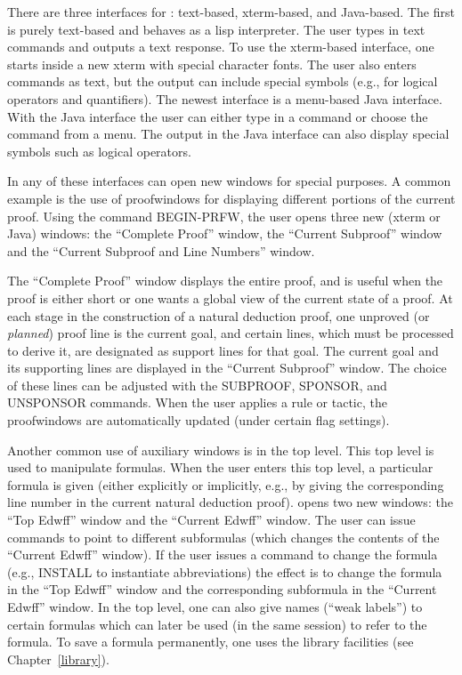 \documentclass[10pt,twoside]{book}
\begin{document}
There are three interfaces for {\TPS}: text-based,
xterm-based, and Java-based.  The first
is purely text-based and behaves as a lisp interpreter.
The user types in text commands and {\TPS} outputs
a text response. %
To use the xterm-based interface, one starts
{\TPS} inside a new xterm with special character fonts.
The user also enters commands as text, but the output
can include special symbols (e.g., for logical operators
and quantifiers). %
The newest interface is a
menu-based Java interface.
With the Java interface
the user can either type in a command or choose
the command from a menu.  The output in the Java interface
can also display special symbols such as logical operators. 

In any of these interfaces {\TPS} can open new windows
for special purposes.  A common example is the use
of proofwindows for displaying different portions of the current
proof.  Using the command {\indexcommand BEGIN-PRFW}, the user opens
three new (xterm or Java) windows: the ``Complete Proof'' window,
the ``Current Subproof'' window and the ``Current Subproof and Line Numbers''
window.

The ``Complete Proof'' window displays the entire proof, and is useful
when the proof is either short or one wants a global view of the
current state of a proof.  At each stage in the construction of a
natural deduction proof, one unproved (or {\it planned}) proof line is
the current goal, and certain lines, which must be processed to derive
it, are designated as support lines for that goal. The current goal
and its supporting lines are displayed in the ``Current Subproof''
window.  The choice of these lines can be adjusted with the 
SUBPROOF, SPONSOR, and UNSPONSOR commands.
When the user applies a rule or tactic, the proofwindows
are automatically updated (under certain flag settings).

Another common use of auxiliary windows is in the
 top level.
This top level is used to manipulate formulas.
When the user enters this top level, a particular
formula is given (either explicitly or implicitly,
e.g., by giving the corresponding line number in
the current natural deduction proof).
{\TPS} opens two new windows: the ``Top Edwff''
window and the ``Current Edwff'' window.
The user can issue commands to point to different
subformulas (which changes the contents of the ``Current Edwff''
window).  If the user issues a command to change the
formula (e.g., {\indexcommand INSTALL} to instantiate abbreviations)
the effect is to change the formula in the ``Top Edwff'' window
and the corresponding subformula in the ``Current Edwff'' window.
In the  top level, one can also give names (``weak labels'')
to certain formulas which can later be used (in the same {\TPS} session) to refer to
the formula.  To save a formula permanently, one uses
the library facilities (see Chapter~\ref{library}).
\end{document}
